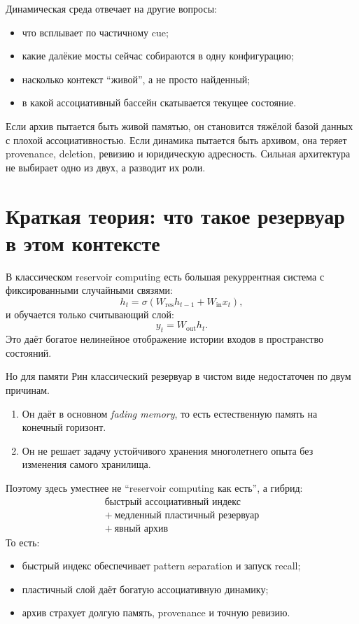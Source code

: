 Динамическая среда отвечает на другие вопросы:
\begin{itemize}
\item что всплывает по частичному cue;
\item какие далёкие мосты сейчас собираются в одну конфигурацию;
\item насколько контекст ``живой'', а не просто найденный;
\item в какой ассоциативный бассейн скатывается текущее состояние.
\end{itemize}

\begin{principle}
Если архив пытается быть живой памятью, он становится тяжёлой базой данных с плохой
ассоциативностью. Если динамика пытается быть архивом, она теряет provenance, deletion,
ревизию и юридическую адресность. Сильная архитектура не выбирает одно из двух, а
разводит их роли.
\end{principle}

\section{Краткая теория: что такое резервуар в этом контексте}

В классическом reservoir computing есть большая рекуррентная система с фиксированными
случайными связями:
\[
h_t = \sigma(W_{\mathrm{res}}h_{t-1}+W_{\mathrm{in}}x_t),
\]
и обучается только считывающий слой:
\[
y_t=W_{\mathrm{out}}h_t.
\]
Это даёт богатое нелинейное отображение истории входов в пространство состояний.

Но для памяти Рин классический резервуар в чистом виде недостаточен по двум причинам.
\begin{enumerate}
\item Он даёт в основном \emph{fading memory}, то есть естественную память на конечный
горизонт.
\item Он не решает задачу устойчивого хранения многолетнего опыта без изменения самого
хранилища.
\end{enumerate}

Поэтому здесь уместнее не ``reservoir computing как есть'', а гибрид:
\[
\boxed{
\begin{gathered}
\text{быстрый ассоциативный индекс}\\
{}+{}\ \text{медленный пластичный резервуар}\\
{}+{}\ \text{явный архив}
\end{gathered}
}
\]
То есть:
\begin{itemize}
\item быстрый индекс обеспечивает pattern separation и запуск recall;
\item пластичный слой даёт богатую ассоциативную динамику;
\item архив страхует долгую память, provenance и точную ревизию.
\end{itemize}

